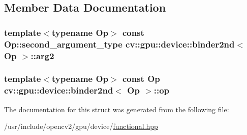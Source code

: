 \subsection{Member Data Documentation}
\hypertarget{structcv_1_1gpu_1_1device_1_1binder2nd_a61906ed07087367d669418e9614e9431}{
\subsubsection[{arg2}]{\setlength{\rightskip}{0pt plus 5cm}template$<$typename Op$>$ const Op\-::second\-\_\-argument\-\_\-type {\bf cv\-::gpu\-::device\-::binder2nd}$<$ Op $>$\-::arg2}}\label{structcv_1_1gpu_1_1device_1_1binder2nd_a61906ed07087367d669418e9614e9431}
\hypertarget{structcv_1_1gpu_1_1device_1_1binder2nd_afeaabb51d77e0bb9f2828340aa62f26d}{
\subsubsection[{op}]{\setlength{\rightskip}{0pt plus 5cm}template$<$typename Op$>$ const Op {\bf cv\-::gpu\-::device\-::binder2nd}$<$ Op $>$\-::op}}\label{structcv_1_1gpu_1_1device_1_1binder2nd_afeaabb51d77e0bb9f2828340aa62f26d}


The documentation for this struct was generated from the following file\-:\begin{DoxyCompactItemize}
\item 
/usr/include/opencv2/gpu/device/\hyperlink{functional_8hpp}{functional.\-hpp}\end{DoxyCompactItemize}
